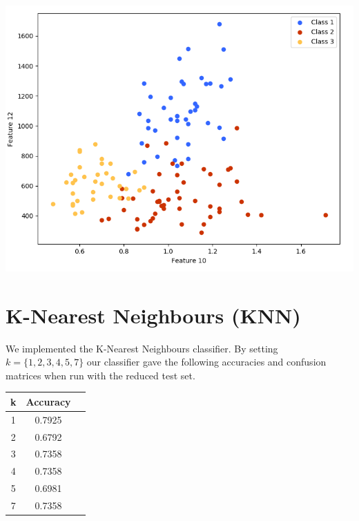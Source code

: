 \documentclass[11pt]{article}
\begin{document}
\begin{center}
\includegraphics[scale=0.3]{features_10_12}
\end{center}

\section{K-Nearest Neighbours (KNN)}
We implemented the K-Nearest Neighbours classifier. By setting $k = \{1,2,3,4,5,7\}$ our classifier gave the following accuracies and confusion matrices when run with the reduced test set.

\begin{center}
\begin{tabular}{c|c|c}
\textbf{k} & \textbf{Accuracy}\\
\hline
1 & 0.7925\\
2 & 0.6792\\
3 & 0.7358\\
4 & 0.7358\\
5 & 0.6981\\
7 & 0.7358\\
\end{tabular}
\end{center}
\end{document}
